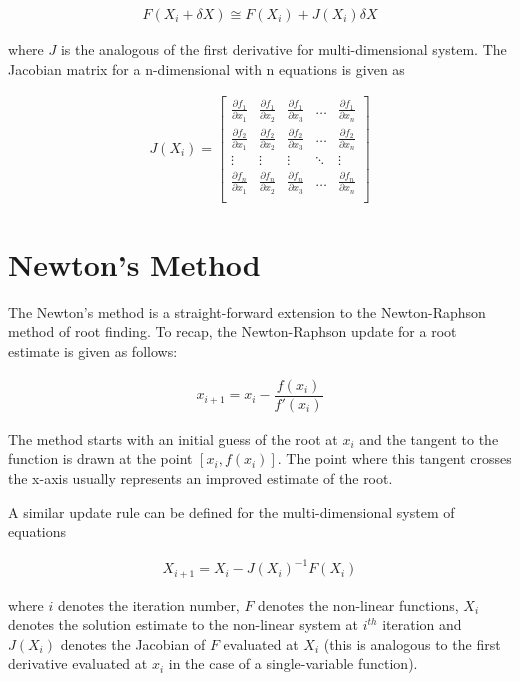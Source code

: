 \documentclass[book.tex]{subfiles}
\begin{document}
\begin{align}
F(X_i + \delta X)  \cong F(X_i) + J(X_i)\delta X
\end{align}

where $J$ is the analogous of the first derivative for multi-dimensional system. The Jacobian matrix for a n-dimensional with n equations is given as

\begin{align}
 J(X_i) = \begin{bmatrix}
 \frac{\partial f_1}{\partial x_1} & \frac{\partial f_1}{\partial x_2} & \frac{\partial f_1}{\partial x_3} & \dots  & \frac{\partial f_1}{\partial x_n} \\
 \frac{\partial f_2}{\partial x_1} & \frac{\partial f_2}{\partial x_2} & \frac{\partial f_2}{\partial x_3} & \dots  & \frac{\partial f_2}{\partial x_n} \\
 \vdots & \vdots & \vdots & \ddots & \vdots \\
 \frac{\partial f_n}{\partial x_1} & \frac{\partial f_n}{\partial x_2} & \frac{\partial f_n}{\partial x_3} & \dots  & \frac{\partial f_n}{\partial x_n} \\
 \end{bmatrix}
\end{align}


\section{Newton's Method}
 The Newton's method is a straight-forward extension to the Newton-Raphson method of root finding. To recap, the Newton-Raphson update for a root estimate is given as follows:
 
 \begin{align}
 x_{i+1} = x_i - \dfrac{f(x_i)}{f'(x_i)}
 \end{align}
 
The method starts with an initial guess of the root at $x_i$ and the tangent to the function is drawn at the point $[x_i,f(x_i)]$. The point where this tangent crosses the x-axis usually represents an improved estimate of the root.
 
A similar update rule can be defined for the multi-dimensional system of equations 
 
\begin{align}
  X_{i+1} =X_{i} - J(X_{i})^{-1}F(X_{i})
\end{align}

where $i$ denotes the iteration number, $F$ denotes the non-linear functions, $X_i$ denotes the solution estimate to the non-linear system at $i^{th}$ iteration and $J(X_{i})$ denotes the Jacobian of $F$ evaluated at $X_{i}$ (this is analogous to the first derivative evaluated at $x_i$ in the case of a single-variable function).
\end{document}
